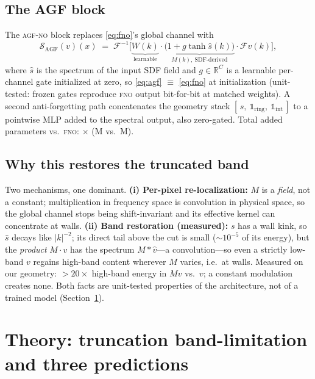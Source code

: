 \documentclass[11pt]{article}
\theoremstyle{definition}
\newcommand{\fno}{\textsc{fno}}
\newcommand{\agfno}{\textsc{agf-no}}
\begin{document}
\subsection{The AGF block}
The \agfno{} block replaces \eqref{eq:fno}'s global channel with
\begin{equation}
\mathcal{S}_{\text{AGF}}(v)(x) \;=\; \mathcal{F}^{-1}\!\big[
\underbrace{W(k)}_{\text{learnable}}
\cdot \underbrace{\big(1 + g \tanh \hat{s}(k)\big)}_{M(k),\ \text{SDF-derived}}
\cdot \mathcal{F}v(k) \big],
\label{eq:agf}
\end{equation}
where $\hat{s}$ is the spectrum of the input SDF field and
$g \in \mathbb{R}^{C}$ is a learnable per-channel gate initialized at zero,
so \eqref{eq:agf} $\equiv$ \eqref{eq:fno} at initialization (unit-tested:
frozen gates reproduce \fno{} output bit-for-bit at matched weights). A second
anti-forgetting path concatenates the geometry stack
$[\,s,\ \mathbb{1}_{\text{ring}},\ \mathbb{1}_{\text{int}}\,]$ to a pointwise
MLP added to the spectral output, also zero-gated. Total added parameters
vs.\ \fno{}: \FullAgfVsFnoParamsRatio{}$\times$
(\ExpAgfParams{}M vs.\ \ExpFnoParams{}M).

\subsection{Why this restores the truncated band}
Two mechanisms, one dominant. \textbf{(i) Per-pixel re-localization:}
$M$ is a \emph{field}, not a constant; multiplication in frequency space is
convolution in physical space, so the global channel stops being
shift-invariant and its effective kernel can concentrate at walls.
\textbf{(ii) Band restoration (measured):} $s$ has a wall kink, so
$\hat{s}$ decays like $|k|^{-2}$; its direct tail above the cut is small
($\sim 10^{-5}$ of its energy), but the \emph{product} $M \cdot v$ has the
spectrum $\hat{M} * \hat{v}$---a convolution---so even a strictly low-band
$v$ regains high-band content wherever $M$ varies, i.e.\ at walls. Measured
on our geometry: $>20\times$ high-band energy in $M v$ vs.\ $v$; a constant
modulation creates none. Both facts are unit-tested properties of the
architecture, not of a trained model (Section~\ref{sec:theory}).

\section{Theory: truncation band-limitation and three predictions}
\label{sec:theory}
\end{document}
